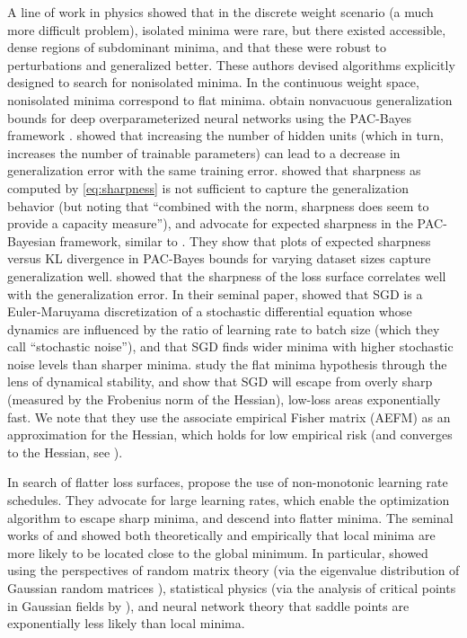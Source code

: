 A line of work in physics \cite{baldassi2015subdominant,baldassi2016unreasonable} showed that in the discrete weight scenario (a much more difficult problem), isolated minima were rare, but there existed accessible, dense regions of subdominant minima, and that these were robust to perturbations and generalized better. These authors devised algorithms explicitly designed to search for nonisolated minima. In the continuous weight space, nonisolated minima correspond to flat minima. \citet{dziugaite2017computing} obtain nonvacuous generalization bounds for deep overparameterized neural networks using the PAC-Bayes framework \cite{mcallester1999pac}. \citet{neyshabur2014search} showed that increasing the number of hidden units (which in turn, increases the number of trainable parameters) can lead to a decrease in generalization error with the same training error. \citet{neyshabur2017exploring} showed that sharpness as computed by \eqref{eq:sharpness} is not sufficient to capture the generalization behavior (but noting that ``combined with the norm, sharpness does seem to provide a capacity measure''), and advocate for expected sharpness in the PAC-Bayesian framework, similar to \citet{dziugaite2017computing}. They show that plots of expected sharpness versus KL divergence in PAC-Bayes bounds for varying dataset sizes capture generalization well. \citet{li2018visualizing} showed that the sharpness of the loss surface correlates well with the generalization error. In their seminal paper, \citet{jastrzkebski2017three} showed that SGD is a Euler-Maruyama discretization of a stochastic differential equation whose dynamics are influenced by the ratio of learning rate to batch size (which they call ``stochastic noise''), and that SGD finds wider minima with higher stochastic noise levels than sharper minima. \citet{wu2023implicit} study the flat minima hypothesis through the lens of dynamical stability, and show that SGD will escape from overly sharp (measured by the Frobenius norm of the Hessian), low-loss areas exponentially fast. We note that they use the associate empirical Fisher matrix (AEFM) as an approximation for the Hessian, which holds for low empirical risk (and converges to the Hessian, see \citet{kunstner2019limitations}).

In search of flatter loss surfaces, \citet{seong2018towards} propose the use of non-monotonic learning rate schedules. They advocate for large learning rates, which enable the optimization algorithm to escape sharp minima, and descend into flatter minima. The seminal works of \citet{dauphin2014identifying} and \citet{choromanska2015loss} showed both theoretically and empirically that local minima are more likely to be located close to the global minimum. In particular, \citet{dauphin2014identifying} showed using the perspectives of random matrix theory (via the eigenvalue distribution of Gaussian random matrices \cite{wigner1958distribution}), statistical physics (via the analysis of critical points in Gaussian fields by \citet{bray2007statistics}), and neural network theory \cite{saxe2013exact} that saddle points are exponentially less likely than local minima.

